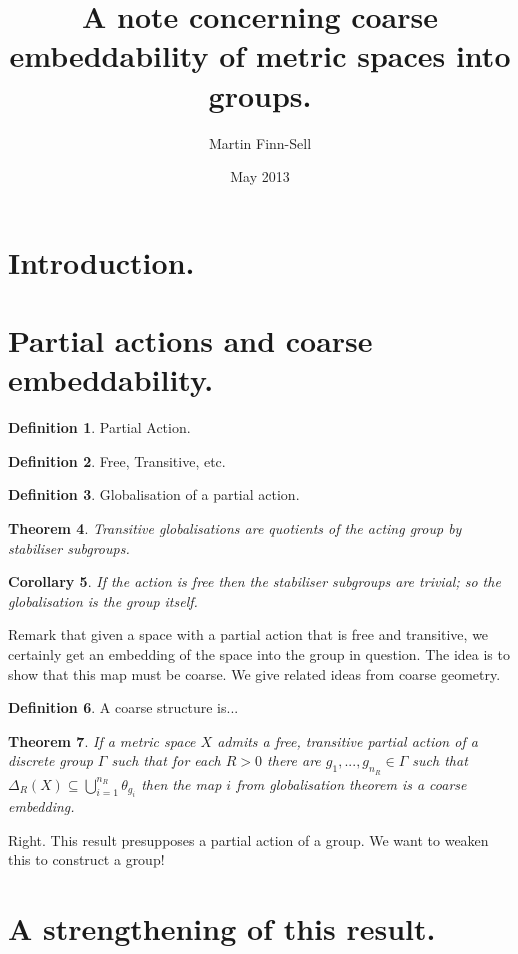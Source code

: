 \documentclass[11pt,a4paper]{amsart}
\title{A note concerning coarse embeddability of metric spaces into groups.}
\date{May 2013}
\author{Martin Finn-Sell}
\theoremstyle{plain}
\newtheorem{theorem}{Theorem}%
\newtheorem{corollary}[theorem]{Corollary}%
\theoremstyle{definition}%
\newtheorem{definition}[theorem]{Definition}%
\theoremstyle{remark}%
\begin{document}
\section{Introduction.}

\section{Partial actions and coarse embeddability.}

\begin{definition}
Partial Action.
\end{definition}

\begin{definition}
Free, Transitive, etc. 
\end{definition}

\begin{definition}
Globalisation of a partial action.
\end{definition}

\begin{theorem}
Transitive globalisations are quotients of the acting group by stabiliser subgroups. 
\end{theorem}

\begin{corollary}
If the action is free then the stabiliser subgroups are trivial; so the globalisation is the group itself.
\end{corollary}

Remark that given a space with a partial action that is free and transitive, we certainly get an embedding of the space into the group in question. The idea is to show that this map must be coarse. We give related ideas from coarse geometry.

\begin{definition}
A coarse structure is...
\end{definition}

\begin{theorem}
If a metric space $X$ admits a free, transitive partial action of a discrete group $\Gamma$ such that for each $R>0$ there are $g_{1},...,g_{n_{R}} \in \Gamma$ such that $\Delta_{R}(X) \subseteq \bigcup_{i=1}^{n_{R}}\theta_{g_{i}}$ then the map $i$ from globalisation theorem is a coarse embedding.
\end{theorem}

Right. This result presupposes a partial action of a group. We want to weaken this to construct a group!

\section{A strengthening of this result.}
\end{document}
